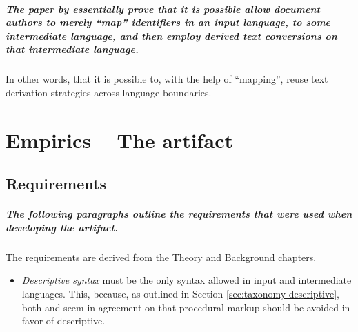 \documentclass{scrreprt}
\begin{document}
\paragraph{The paper by \citet{krijnen} essentially prove that it is possible allow document authors to merely ``map'' identifiers in an input language, to some intermediate language, and then employ derived text conversions on that intermediate language.} In other words, that it is possible to, with the help of ``mapping'', reuse text derivation strategies across language boundaries.

























%
%
%
%
%
%


\chapter{Empirics -- The artifact}



%
%


\section{Requirements}
\label{sec:empirical-requirements}
\paragraph{The following paragraphs outline the requirements that were used when developing the artifact.} The requirements are derived from the Theory and Background chapters.

\begin{itemize}
\item \emph{Descriptive syntax} must be the only syntax allowed in input and intermediate languages. This, because, as outlined in Section \ref{sec:taxonomy-descriptive}, both \citet{coombs} and \citet{bray} seem in agreement on that procedural markup should be avoided in favor of descriptive.
\end{itemize}
\end{document}
